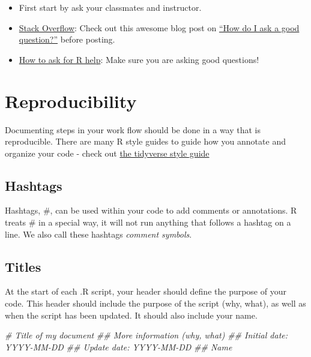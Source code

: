 \documentclass[
]{book}
\newenvironment{Shaded}{\begin{snugshade}}{\end{snugshade}}
\newcommand{\CommentTok}[1]{\textcolor[rgb]{0.56,0.35,0.01}{\textit{#1}}}
\begin{document}
\begin{itemize}
\item
  First start by ask your classmates and instructor.
\item
  \href{https://stackoverflow.com/questions/tagged/r?tab=Votes}{Stack Overflow}: Check out this awesome blog post on \href{https://stackoverflow.com/help/how-to-ask}{``How do I ask a good question?''} before posting.
\item
  \href{https://blog.revolutionanalytics.com/2014/01/how-to-ask-for-r-help.html}{How to ask for R help}: Make sure you are asking good questions!
\end{itemize}

\hypertarget{reproducibility}{%
\section{Reproducibility}\label{reproducibility}}

Documenting steps in your work flow should be done in a way that is reproducible. There are many R style guides to guide how you annotate and organize your code - check out \href{https://style.tidyverse.org/}{the tidyverse style guide}

\hypertarget{hashtags}{%
\subsection*{Hashtags}\label{hashtags}}

Hashtags, \#, can be used within your code to add comments or annotations. R treats \# in a special way, it will not run anything that follows a hashtag on a line. We also call these hashtags \emph{comment symbols}.

\hypertarget{titles}{%
\subsection*{Titles}\label{titles}}

At the start of each .R script, your header should define the purpose of your code. This header should include the purpose of the script (why, what), as well as when the script has been updated. It should also include your name.

\begin{Shaded}
\begin{Highlighting}[]
\CommentTok{\# Title of my document}
\CommentTok{\#\# More information (why, what)}
\CommentTok{\#\# Initial date: YYYY{-}MM{-}DD}
\CommentTok{\#\# Update date: YYYY{-}MM{-}DD}
\CommentTok{\#\# Name }
\end{Highlighting}
\end{Shaded}
\end{document}
